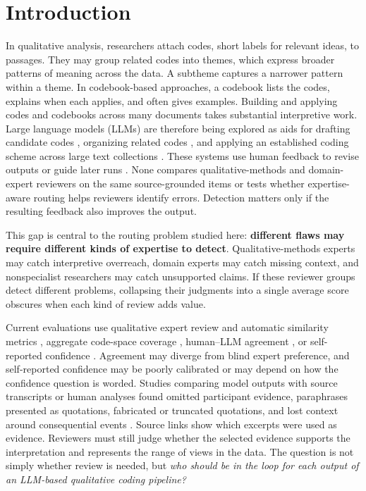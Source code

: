 
\section{Introduction}

In qualitative analysis, researchers attach codes, short labels for relevant ideas, to passages. They may group related codes into themes, which express broader patterns of meaning across the data. A subtheme captures a narrower pattern within a theme. In codebook-based approaches, a codebook lists the codes, explains when each applies, and often gives examples. Building and applying codes and codebooks across many documents takes substantial interpretive work. Large language models (LLMs) are therefore being explored as aids for drafting candidate codes \citep{dai2023llm}, organizing related codes \citep{wang2026centaurta}, and applying an established coding scheme across large text collections \citep{matveyenko2026muse}. These systems use human feedback to revise outputs or guide later runs \citep{dai2023llm,wang2026centaurta,matveyenko2026muse}. None compares qualitative-methods and domain-expert reviewers on the same source-grounded items or tests whether expertise-aware routing helps reviewers identify errors. Detection matters only if the resulting feedback also improves the output.

This gap is central to the routing problem studied here: \textbf{different flaws may require different kinds of expertise to detect}. Qualitative-methods experts may catch interpretive overreach, domain experts may catch missing context, and nonspecialist researchers may catch unsupported claims. If these reviewer groups detect different problems, collapsing their judgments into a single average score obscures when each kind of review adds value.

Current evaluations use qualitative expert review and automatic similarity metrics \citep{yi2025position}, aggregate code-space coverage \citep{chen2026opencodes}, human--LLM agreement \citep{liu2026agreement}, or self-reported confidence \citep{li2026confidence}. Agreement may diverge from blind expert preference, and self-reported confidence may be poorly calibrated or may depend on how the confidence question is worded. Studies comparing model outputs with source transcripts or human analyses found omitted participant evidence, paraphrases presented as quotations, fabricated or truncated quotations, and lost context around consequential events \citep{parkington2025human,bang2026hybrid,subbiah2026story}. Source links show which excerpts were used as evidence. Reviewers must still judge whether the selected evidence supports the interpretation and represents the range of views in the data. The question is not simply whether review is needed, but \emph{who should be in the loop for each output of an LLM-based qualitative coding pipeline?}

